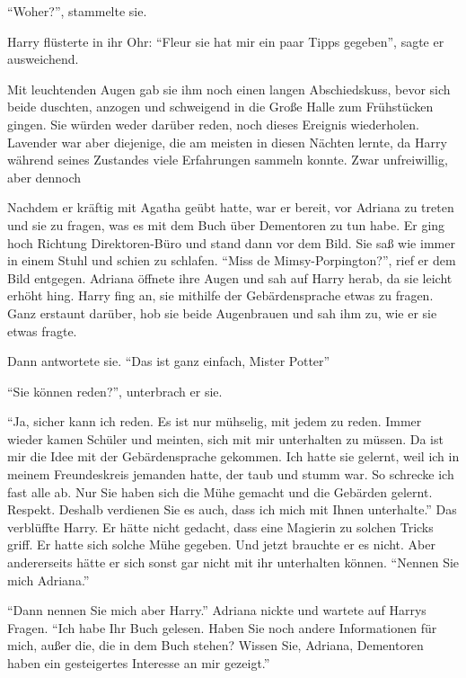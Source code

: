 \enquote{Woher?}, stammelte sie.

Harry flüsterte in ihr Ohr: \enquote{Fleur \gst sie hat mir ein paar Tipps gegeben}, sagte er ausweichend.

Mit leuchtenden Augen gab sie ihm noch einen langen Abschiedskuss, bevor sich beide duschten, anzogen und schweigend in die Große Halle zum Frühstücken gingen. Sie würden weder darüber reden, noch dieses Ereignis wiederholen. Lavender war aber diejenige, die am meisten in diesen Nächten lernte, da Harry während seines Zustandes viele Erfahrungen sammeln konnte. Zwar unfreiwillig, aber dennoch\abs

\trenn

Nachdem er kräftig mit Agatha geübt hatte, war er bereit, vor Adriana zu treten und sie zu fragen, was es mit dem Buch über Dementoren zu tun habe. Er ging hoch Richtung Direktoren-Büro und stand dann vor dem Bild. Sie saß wie immer in einem Stuhl und schien zu schlafen. \enquote{Miss de Mimsy-Porpington?}, rief er dem Bild entgegen. Adriana öffnete ihre Augen und sah auf Harry herab, da sie leicht erhöht hing. Harry fing an, sie mithilfe der Gebärdensprache etwas zu fragen. Ganz erstaunt darüber, hob sie beide Augenbrauen und sah ihm zu, wie er sie etwas fragte.

Dann antwortete sie. \enquote{Das ist ganz einfach, Mister Potter\abs}

\enquote{Sie können reden?}, unterbrach er sie.

\enquote{Ja, sicher kann ich reden. Es ist nur mühselig, mit jedem zu reden. Immer wieder kamen Schüler und meinten, sich mit mir unterhalten zu müssen. Da ist mir die Idee mit der Gebärdensprache gekommen. Ich hatte sie gelernt, weil ich in meinem Freundeskreis jemanden hatte, der taub und stumm war. So schrecke ich fast alle ab. Nur Sie haben sich die Mühe gemacht und die Gebärden gelernt. Respekt. \gst Deshalb verdienen Sie es auch, dass ich mich mit Ihnen unterhalte.} Das verblüffte Harry. Er hätte nicht gedacht, dass eine Magierin zu solchen Tricks griff. Er hatte sich solche Mühe gegeben. Und jetzt brauchte er es nicht. Aber andererseits hätte er sich sonst gar nicht mit ihr unterhalten können. \enquote{Nennen Sie mich Adriana.}

\enquote{Dann nennen Sie mich aber Harry.} Adriana nickte und wartete auf Harrys Fragen. \enquote{Ich habe Ihr Buch  gelesen. Haben Sie noch andere Informationen für mich, außer die, die in dem Buch stehen? Wissen Sie, Adriana, Dementoren haben ein gesteigertes Interesse an mir gezeigt.}

